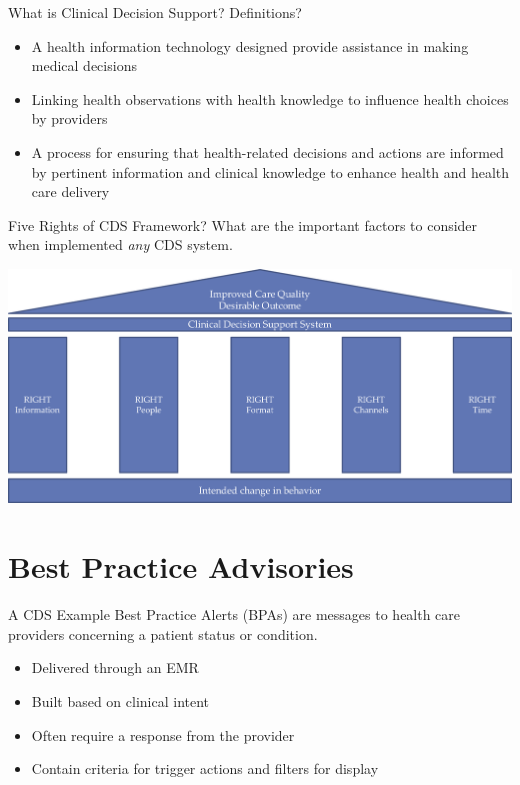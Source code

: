 \documentclass[10pt]{beamer}
\begin{document}
\begin{frame}{What is Clinical Decision Support?}
Definitions?
\pause
\begin{itemize}
	\item A health information technology designed provide assistance in making medical decisions
	\pause
	\item Linking health observations with health knowledge to influence health choices by providers
	\pause
	\item A process for ensuring that health-related decisions and actions are informed by pertinent information and clinical knowledge to enhance health and health care delivery
\end{itemize}
\end{frame}

\begin{frame}{Five Rights of CDS Framework?}
What are the important factors to consider when implemented \emph{any} CDS system.
\pause
	\begin{center}
		\includegraphics[width=1.0\textwidth, center, trim=0cm 0cm 0 0cm]{images/five_rights.png}
	\end{center}
\end{frame}

\section{Best Practice Advisories}

\begin{frame}{A CDS Example}
Best Practice Alerts (BPAs) are messages to health care providers concerning a patient status or condition.
\pause
\begin{itemize}
	\item Delivered through an EMR
	\pause
	\item Built based on clinical intent
	\pause
	\item Often require a response from the provider
	\pause
	\item Contain criteria for trigger actions and filters for display
\end{itemize}
\end{frame}
\end{document}
